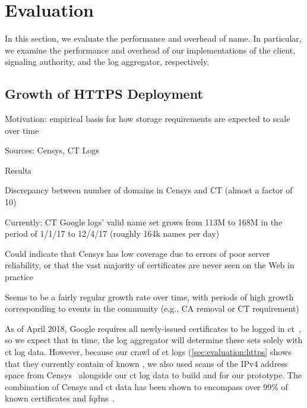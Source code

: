 \section{Evaluation}
\label{sec:evaluation}

In this section, we evaluate the performance and overhead of \ac{name}. In
particular, we examine the performance and overhead of our implementations of
the client, signaling authority, and the log aggregator, respectively.

\subsection{Growth of HTTPS Deployment}
\label{sec:evaluation:https}

\begin{compactitem}
\item Motivation: empirical basis for how storage requirements are expected to
  scale over time
\item Sources: Censys, CT Logs
\item Results
  \begin{compactitem}
  \item Discrepancy between number of domains in Censys and CT (almost a factor
    of 10)
    \begin{compactitem}
    \item Currently: CT Google logs' valid name set grows from 113M to 168M in
      the period of 1/1/17 to 12/4/17 (roughly 164k names per day)
    \item Could indicate that Censys has low coverage due to errors of poor
      server reliability, or that the vast majority of certificates are never
      seen on the Web in practice
    \end{compactitem}
  \item Seems to be a fairly regular growth rate over time, with periods of high
    growth corresponding to events in the community (e.g., CA removal or CT
    requirement)
  \item {}
  \item {}
  \item {}
  \end{compactitem}
\end{compactitem}

As of April 2018, Google requires all newly-issued certificates to
be logged in \ac{ct}~\cite{sleevi2017certificate}, so we expect that in time,
the log aggregator will determine these sets solely with \ac{ct} log data.
However, because our crawl of \ac{ct} logs (\autoref{sec:evaluation:https} shows
that they currently contain  of known
, we also used scans of the IPv4 address space
from Censys~\cite{durumeric2015search} alongside our \ac{ct} log data to build
\httpsset and \multicertset for our prototype. The combination of Censys and
\ac{ct} data has been shown to encompass over 99\% of known certificates and
\acp{fqdn}~\cite{vandersloot2016towards}.

